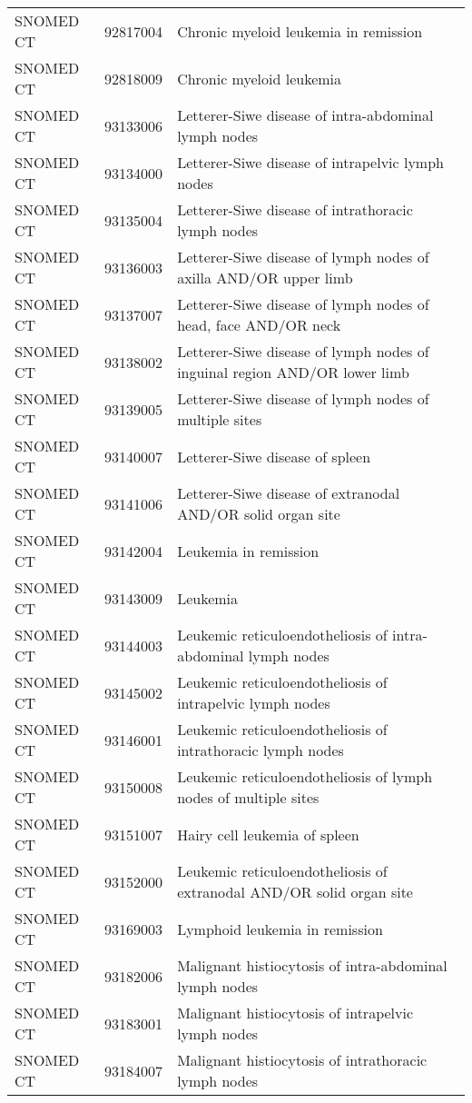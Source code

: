 \begin{longtable}{p{}p{}p{}}
  SNOMED CT & 92817004 & Chronic myeloid leukemia in remission \\ 
  SNOMED CT & 92818009 & Chronic myeloid leukemia \\ 
  SNOMED CT & 93133006 & Letterer-Siwe disease of intra-abdominal lymph nodes \\ 
  SNOMED CT & 93134000 & Letterer-Siwe disease of intrapelvic lymph nodes \\ 
  SNOMED CT & 93135004 & Letterer-Siwe disease of intrathoracic lymph nodes \\ 
  SNOMED CT & 93136003 & Letterer-Siwe disease of lymph nodes of axilla AND/OR upper limb \\ 
  SNOMED CT & 93137007 & Letterer-Siwe disease of lymph nodes of head, face AND/OR neck \\ 
  SNOMED CT & 93138002 & Letterer-Siwe disease of lymph nodes of inguinal region AND/OR lower limb \\ 
  SNOMED CT & 93139005 & Letterer-Siwe disease of lymph nodes of multiple sites \\ 
  SNOMED CT & 93140007 & Letterer-Siwe disease of spleen \\ 
  SNOMED CT & 93141006 & Letterer-Siwe disease of extranodal AND/OR solid organ site \\ 
  SNOMED CT & 93142004 & Leukemia in remission \\ 
  SNOMED CT & 93143009 & Leukemia \\ 
  SNOMED CT & 93144003 & Leukemic reticuloendotheliosis of intra-abdominal lymph nodes \\ 
  SNOMED CT & 93145002 & Leukemic reticuloendotheliosis of intrapelvic lymph nodes \\ 
  SNOMED CT & 93146001 & Leukemic reticuloendotheliosis of intrathoracic lymph nodes \\ 
  SNOMED CT & 93150008 & Leukemic reticuloendotheliosis of lymph nodes of multiple sites \\ 
  SNOMED CT & 93151007 & Hairy cell leukemia of spleen \\ 
  SNOMED CT & 93152000 & Leukemic reticuloendotheliosis of extranodal AND/OR solid organ site \\ 
  SNOMED CT & 93169003 & Lymphoid leukemia in remission \\ 
  SNOMED CT & 93182006 & Malignant histiocytosis of intra-abdominal lymph nodes \\ 
  SNOMED CT & 93183001 & Malignant histiocytosis of intrapelvic lymph nodes \\ 
  SNOMED CT & 93184007 & Malignant histiocytosis of intrathoracic lymph nodes \\ 

\end{longtable}
